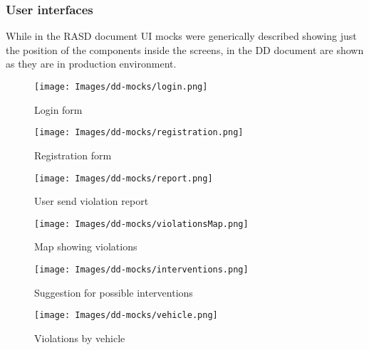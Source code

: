 \subsubsection{User interfaces}
While in the RASD document UI mocks were generically described showing just the position of the components inside the screens, in the DD document are shown as they are in production environment.

\begin{figure}[H]
	\centering
	\begin{minipage}[b]{0.40\textwidth}
		\texttt{[image: Images/dd-mocks/login.png]}
		\caption{Login form}
	\end{minipage}
	\hfill
	\begin{minipage}[b]{0.40\textwidth}
		\texttt{[image: Images/dd-mocks/registration.png]}
		\caption{Registration form}
	\end{minipage}
\end{figure}

\newpage

\begin{figure}[H]
	\centering
	\begin{minipage}[b]{0.40\textwidth}
		\texttt{[image: Images/dd-mocks/report.png]}
		\caption{User send violation report}
	\end{minipage}
	\hfill
	\begin{minipage}[b]{0.40\textwidth}
		\texttt{[image: Images/dd-mocks/violationsMap.png]}
		\caption{Map showing violations}
	\end{minipage}
\end{figure}

\begin{figure}[H]
	\centering
	\begin{minipage}[b]{0.40\textwidth}
		\texttt{[image: Images/dd-mocks/interventions.png]}
		\caption{Suggestion for possible interventions}
	\end{minipage}
	\hfill
	\begin{minipage}[b]{0.40\textwidth}
		\texttt{[image: Images/dd-mocks/vehicle.png]}
		\caption{Violations by vehicle}
	\end{minipage}
\end{figure}

\newpage





